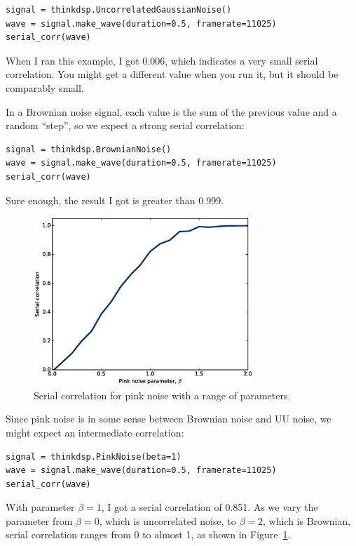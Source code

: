 \documentclass[12pt]{book}
\begin{document}
\begin{verbatim}
signal = thinkdsp.UncorrelatedGaussianNoise()
wave = signal.make_wave(duration=0.5, framerate=11025)
serial_corr(wave)
\end{verbatim}

When I ran this example, I got 0.006, which indicates a very
small serial correlation.  You might get a different value when you run
it, but it should be comparably small.

In a Brownian noise signal, each value is the sum of the previous
value and a random ``step'', so we expect a strong serial
correlation:

\begin{verbatim}
signal = thinkdsp.BrownianNoise()
wave = signal.make_wave(duration=0.5, framerate=11025)
serial_corr(wave)
\end{verbatim}

Sure enough, the result I got is greater than 0.999.

\begin{figure}
\centerline{\includegraphics[height=2.5in]{figs/autocorr3.eps}}
\caption{Serial correlation for pink noise with a range of
parameters.}
\label{fig.autocorr3}
\end{figure}

Since pink noise is in some sense between Brownian noise and UU noise,
we might expect an intermediate correlation:

\begin{verbatim}
signal = thinkdsp.PinkNoise(beta=1)
wave = signal.make_wave(duration=0.5, framerate=11025)
serial_corr(wave)
\end{verbatim}

With parameter $\beta=1$, I got a serial correlation of 0.851.
As we vary the parameter from $\beta=0$, which is uncorrelated
noise, to $\beta=2$, which is Brownian, serial correlation
ranges from 0 to almost 1, as shown in Figure~\ref{fig.autocorr3}.
\end{document}
